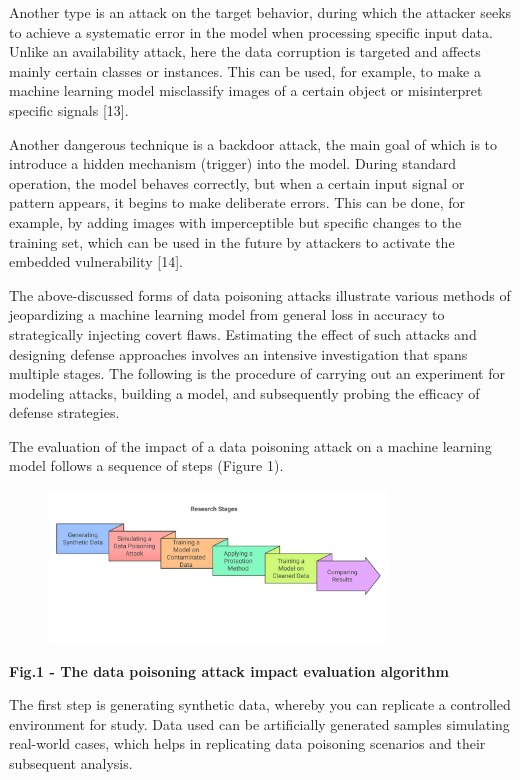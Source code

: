 Another type is an attack on the target behavior, during which the
attacker seeks to achieve a systematic error in the model when
processing specific input data. Unlike an availability attack, here the
data corruption is targeted and affects mainly certain classes or
instances. This can be used, for example, to make a machine learning
model misclassify images of a certain object or misinterpret specific
signals {[}13{]}.

Another dangerous technique is a backdoor attack, the main goal of which
is to introduce a hidden mechanism (trigger) into the model. During
standard operation, the model behaves correctly, but when a certain
input signal or pattern appears, it begins to make deliberate errors.
This can be done, for example, by adding images with imperceptible but
specific changes to the training set, which can be used in the future by
attackers to activate the embedded vulnerability {[}14{]}.

The above-discussed forms of data poisoning attacks illustrate various
methods of jeopardizing a machine learning model from general loss in
accuracy to strategically injecting covert flaws. Estimating the effect
of such attacks and designing defense approaches involves an intensive
investigation that spans multiple stages. The following is the procedure
of carrying out an experiment for modeling attacks, building a model,
and subsequently probing the efficacy of defense strategies.

The evaluation of the impact of a data poisoning attack on a machine
learning model follows a sequence of steps (Figure 1).


\begin{figure}[H]
	\centering
	\includegraphics[width=0.8\textwidth]{media/ict2/image224}
	\caption*{}
\end{figure}


{\bfseries Fig.1 - The data poisoning attack impact evaluation algorithm}

The first step is generating synthetic data, whereby you can replicate a
controlled environment for study. Data used can be artificially
generated samples simulating real-world cases, which helps in
replicating data poisoning scenarios and their subsequent analysis.

